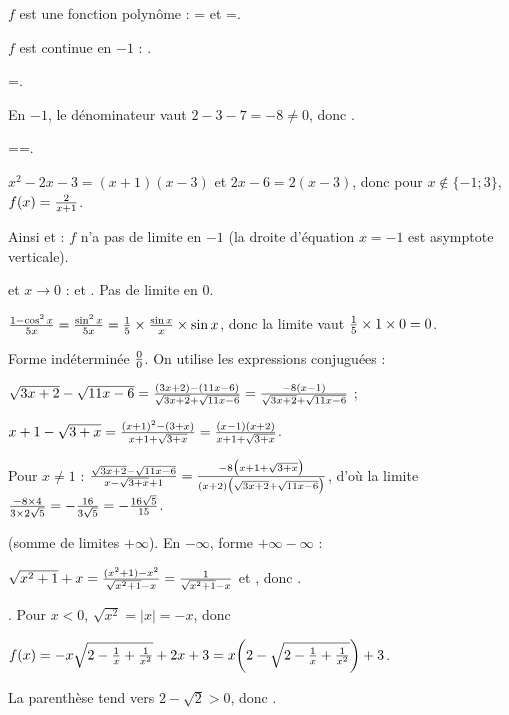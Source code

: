 \begin{corrigeprof}[16]
\be
\item \be
	\item[(a)] $f$ est une fonction polynôme : = et =.
	\par $f$ est continue en $-1$ : .
	\item[(b)] =.
	\par En $-1$, le dénominateur vaut $2-3-7=-8\neq 0$, donc .
	\item[(c)] ==.
	\par $x^2-2x-3=(x+1)(x-3)$ et $2x-6=2(x-3)$, donc pour $x\notin\{-1;3\}$, $f(x)=\frac{2}{x+1}$.
	\par Ainsi  et  : $f$ n'a pas de limite en $-1$ (la droite d'équation $x=-1$ est asymptote verticale).
\ee
\item \be
	\item[(a)]  et $x\to 0$ :  et . Pas de limite en $0$.
	\item[(b)] $\frac{1-\cos^2x}{5x}=\frac{\sin^2 x}{5x}=\frac{1}{5}\times\frac{\sin x}{x}\times\sin x$, donc la limite vaut $\frac{1}{5}\times 1\times 0=0$.
	\item[(c)] Forme indéterminée \og $\frac{0}{0}$\fg{}. On utilise les expressions conjuguées :
	\par $\sqrt{3x+2}-\sqrt{11x-6}=\frac{(3x+2)-(11x-6)}{\sqrt{3x+2}+\sqrt{11x-6}}=\frac{-8(x-1)}{\sqrt{3x+2}+\sqrt{11x-6}}$ ;
	\par $x+1-\sqrt{3+x}=\frac{(x+1)^2-(3+x)}{x+1+\sqrt{3+x}}=\frac{(x-1)(x+2)}{x+1+\sqrt{3+x}}$.
	\par Pour $x\neq 1$ : $\frac{\sqrt{3x+2}-\sqrt{11x-6}}{x-\sqrt{3+x}+1}=\frac{-8\big(x+1+\sqrt{3+x}\big)}{(x+2)\big(\sqrt{3x+2}+\sqrt{11x-6}\big)}$, d'où la limite $\frac{-8\times 4}{3\times 2\sqrt{5}}=-\frac{16}{3\sqrt5}=-\frac{16\sqrt5}{15}$.
\ee
\item \be
	\item[(a)]  (somme de limites $+\infty$). En $-\infty$, forme \og $+\infty-\infty$\fg{} :
	\par $\sqrt{x^2+1}+x=\frac{(x^2+1)-x^2}{\sqrt{x^2+1}-x}=\frac{1}{\sqrt{x^2+1}-x}$ et , donc .
	\item[(b)] . Pour $x<0$, $\sqrt{x^2}=|x|=-x$, donc
	\par $f(x)=-x\sqrt{2-\frac{1}{x}+\frac{1}{x^2}}+2x+3=x\bigg(2-\sqrt{2-\frac{1}{x}+\frac{1}{x^2}}\bigg)+3$.
	\par La parenthèse tend vers $2-\sqrt2>0$, donc .
\ee
\ee
\end{corrigeprof}
